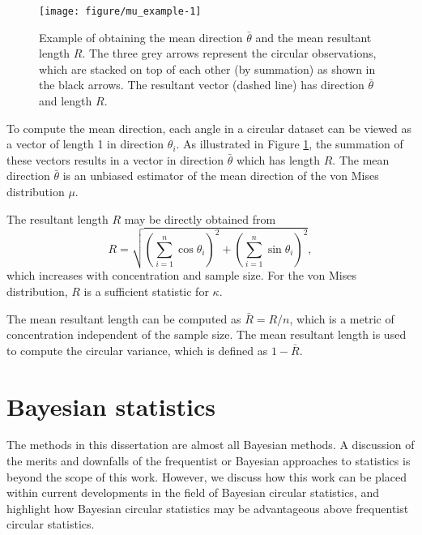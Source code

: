 \documentclass[12pt, a4paper]{book}\usepackage[]{graphicx}\usepackage{xcolor}
\newenvironment{knitrout}{}{} %
\begin{document}
\begin{figure}
\centering
\begin{knitrout}
\color{fgcolor}
\texttt{[image: figure/mu\_example-1]} 

\end{knitrout}
\caption{Example of obtaining the mean direction $\bar{\theta}$ and the mean resultant length $R$. The three grey arrows represent the circular observations, which are stacked on top of each other (by summation) as shown in the black arrows. The resultant vector (dashed line) has direction $\bar{\theta}$ and length $R$.}\label{exampleRMu}
\end{figure}

To compute the mean direction, each angle in a circular dataset can be viewed as a vector of length 1 in direction $\theta_i$. As illustrated in Figure \ref{exampleRMu}, the summation of these vectors results in a vector in direction $\bar{\theta}$ which has length $R$. The mean direction $\bar{\theta}$ is an unbiased estimator of the mean direction of the von Mises distribution $\mu$.

The resultant length $R$ may be directly obtained from
$$ R = \sqrt{\left(\sum_{i=1}^{n} \cos \theta_i \right)^2 + \left(\sum_{i=1}^{n} \sin \theta_i \right)^2},$$
which increases with concentration and sample size. For the von Mises distribution, $R$ is a sufficient statistic for $\kappa$.

The mean resultant length can be computed as $\bar{R} = R/n$, which is a metric of concentration independent of the sample size. The mean resultant length is used to compute the circular variance, which is defined as $1 - \bar{R}.$





\section*{Bayesian statistics}

The methods in this dissertation are almost all Bayesian methods. A discussion of the merits and downfalls of the frequentist or Bayesian approaches to statistics is beyond the scope of this work. However, we discuss how this work can be placed within current developments in the field of Bayesian circular statistics, and highlight how Bayesian circular statistics may be advantageous above frequentist circular statistics.
\end{document}

